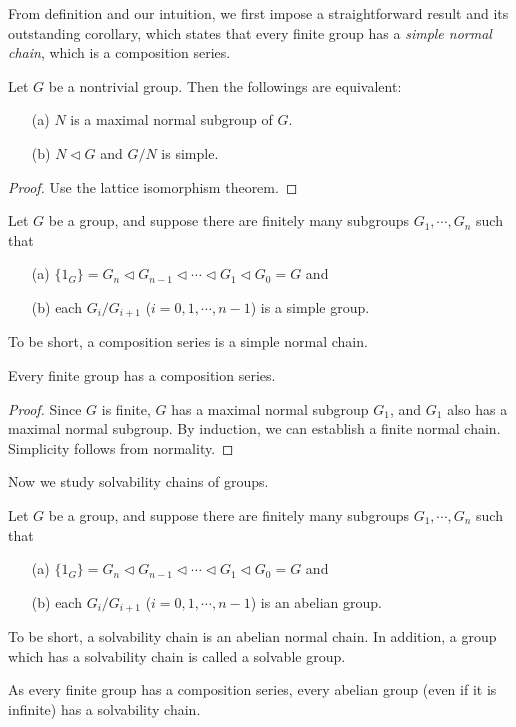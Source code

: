From definition and our intuition, we first impose a straightforward result and its outstanding corollary, which states that every finite group has a \textit{simple normal chain}, which is a composition series.
\begin{prop}
    Let $G$ be a nontrivial group.
    Then the followings are equivalent:
    \begin{enumerate}
        \item[(a)]
        {
            $N$ is a maximal normal subgroup of $G$.
        }
        \item[(b)]
        {
            $N\triangleleft G$ and $G/N$ is simple.
        }
    \end{enumerate}
\end{prop}
\begin{proof}
    Use the lattice isomorphism theorem.
\end{proof}
\begin{defi}
    Let $G$ be a group, and suppose there are finitely many subgroups $G_1, \cdots, G_n$ such that
    \begin{enumerate}
        \item[(a)]
        {
            $\{1_G\}=G_n\triangleleft G_{n-1}\triangleleft \cdots \triangleleft G_1 \triangleleft G_0=G$ and
        }
        \item[(b)]
        {
            each $G_i/G_{i+1}$ ($i=0, 1, \cdots, n-1$) is a simple group.
        }
    \end{enumerate}
    To be short, a composition series is a simple normal chain.
\end{defi}
\begin{cor}
    Every finite group has a composition series.
\end{cor}
\begin{proof}
    Since $G$ is finite, $G$ has a maximal normal subgroup $G_1$, and $G_1$ also has a maximal normal subgroup.
    By induction, we can establish a finite normal chain.
    Simplicity follows from normality.
\end{proof}

Now we study solvability chains of groups.
\begin{defi}
    Let $G$ be a group, and suppose there are finitely many subgroups $G_1, \cdots, G_n$ such that
    \begin{enumerate}
        \item[(a)]
        {
            $\{1_G\}=G_n\triangleleft G_{n-1}\triangleleft \cdots \triangleleft G_1 \triangleleft G_0=G$ and
        }
        \item[(b)]
        {
            each $G_i/G_{i+1}$ ($i=0, 1, \cdots, n-1$) is an abelian group.
        }
    \end{enumerate}
    To be short, a solvability chain is an abelian normal chain.
    In addition, a group which has a solvability chain is called a solvable group.
\end{defi}
As every finite group has a composition series, every abelian group (even if it is infinite) has a solvability chain.

